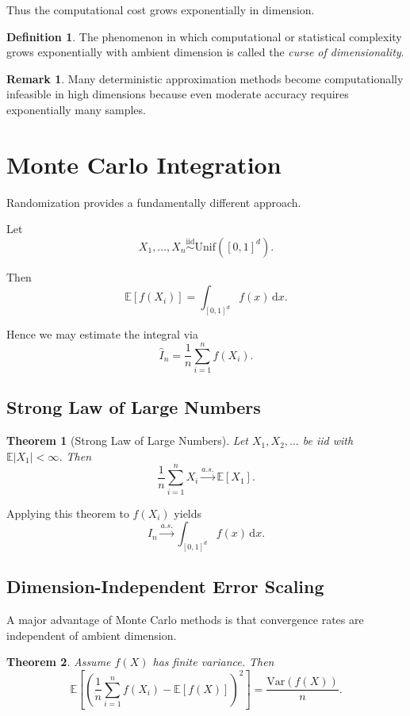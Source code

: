 \documentclass[12pt,oneside]{book}
\numberwithin{equation}{section}
\theoremstyle{definition}
\newtheorem{definition}{Definition}[section]
\newtheorem{remark}{Remark}[section]
\theoremstyle{plain}
\newtheorem{theorem}{Theorem}[section]
\theoremstyle{remark}
\newcommand{\E}{\mathbb{E}}
\newcommand{\Var}{\mathrm{Var}}
\newcommand{\iid}{\overset{\text{iid}}{\sim}}
\newcommand{\as}{\overset{a.s.}{\to}}
\newcommand{\dd}{\,\mathrm{d}}
\begin{document}
Thus the computational cost grows exponentially in dimension.

\begin{definition}
The phenomenon in which computational or statistical complexity grows exponentially with ambient dimension is called the \emph{curse of dimensionality}.
\end{definition}

\begin{remark}
Many deterministic approximation methods become computationally infeasible in high dimensions because even moderate accuracy requires exponentially many samples.
\end{remark}

\section{Monte Carlo Integration}

Randomization provides a fundamentally different approach.

Let
\[
X_1,\dots,X_n \iid \mathrm{Unif}([0,1]^d).
\]

Then
\[
\E[f(X_i)]
=
\int_{[0,1]^d} f(x)\dd x.
\]

Hence we may estimate the integral via
\[
\widehat{I}_n
=
\frac{1}{n}\sum_{i=1}^n f(X_i).
\]

\subsection{Strong Law of Large Numbers}

\begin{theorem}[Strong Law of Large Numbers]
Let $X_1,X_2,\dots$ be iid with $\E|X_1|<\infty$. Then
\[
\frac{1}{n}\sum_{i=1}^n X_i
\as
\E[X_1].
\]
\end{theorem}

Applying this theorem to $f(X_i)$ yields
\[
\widehat{I}_n
\as
\int_{[0,1]^d} f(x)\dd x.
\]

\subsection{Dimension-Independent Error Scaling}

A major advantage of Monte Carlo methods is that convergence rates are independent of ambient dimension.

\begin{theorem}
Assume $f(X)$ has finite variance. Then
\[
\E\left[
\left(
\frac{1}{n}\sum_{i=1}^n f(X_i)-\E[f(X)]
\right)^2
\right]
=
\frac{\Var(f(X))}{n}.
\]
\end{theorem}
\end{document}
